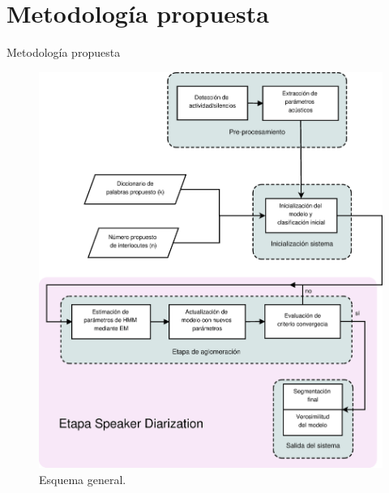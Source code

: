 
\section{Metodología propuesta}

\begin{frame}{Metodología propuesta}
  \begin{figure}[bth]
    \centerline
    {\includegraphics[width=0.6\linewidth]{gfx/general_flow}} \quad
    \caption{Esquema general.}
    \label{fig:esquema}
  \end{figure}
\end{frame}




